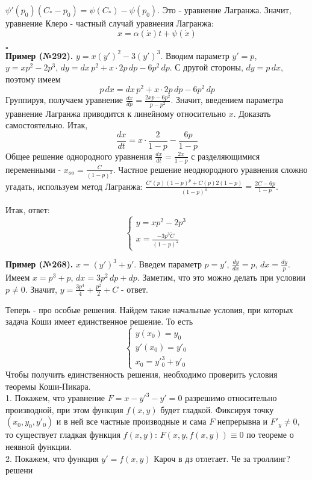 $\psi'(p_0)(C_*-p_0)=\psi(C_*)-\psi(p_0)$. 
Это - уравнение Лагранжа. Значит, уравнение Клеро - частный случай уравнения 
Лагранжа:
$$x=\alpha(\dot x)t+\psi(\dot x)$$


$\square$ \\

\textbf{Пример (№292).} $y=x(y')^2-3(y')^3$. Вводим параметр 
 $y'=p$, $y=xp^2-2p^3$,  $dy=dx\,p^2+x\cdot 2p\,dp-6p^2\,dp$. С другой 
 стороны, $dy=p\,dx$, поэтому имеем
$$p\,dx=dx\,p^2+x\cdot 2p\,dp-6p^2\,dp$$ 
Группируя,  получаем уравнение $\frac{dx}{dp}=\frac{2xp-6p^2}{p-p^2}$.
Значит, введением параметра уравнение Лагранжа приводится к линейному
относительно $x$. Доказать самостоятельно. Итак,
$$\frac{dx}{dt}=x\cdot \frac{2}{1-p}-\frac{6p}{1-p}$$ 
Общее решение однородного уравнения $\frac{dx}{dt}=\frac{2x}{1-p}$ 
с разделяющимися переменными - $x_{oo}=\frac{C}{(1-p)^2}$. 
Частное решение неоднородного уравнения сложно угадать, используем 
метод Лагранжа: $\frac{C'(p)(1-p)^p+C(p)2(1-p)}{(1-p)^4}=\frac{2C-6p}{1-p}$.

Итак, ответ:
$$\begin{cases}
    y=xp^2-2p^3\\x=\frac{-3p^3\tilde C}{(1-p)^2}
\end{cases}$$

\textbf{Пример (№268).}
$x=(y')^3+y'$. Введем параметр  $p=y'$,  $\frac{dy}{dx}=p$, $dx=\frac{dy}{p}$.
Имеем $x=p^3+p$,  $dx=3p^2\,dp+dp$. Заметим, что это можно делать при 
условии  $p\ne 0$. 
Значит,  $y=\frac{3p^4}{4}+\frac{p^2}{2}+C$ - ответ.

Теперь - про особые решения. Найдем такие начальные условия, при которых
задача Коши имеет единственное решение. То есть
$$\begin{cases}
    y(x_0)=y_0\\y'(x_0)=y'_0\\x_0=y'^3_0+y'_0
\end{cases}$$
Чтобы получить единственность решения, необходимо проверить условия
теоремы Коши-Пикара.\\
1. Покажем, что уравнение $F=x-y'^3-y'=0$ разрешимо относительно производной, 
при этом функция  $f(x,y)$ будет гладкой. Фиксируя точку
$(x_0,y_0,y'_0)$ и в ней все частные производные и сама $F$ непрерывна и
$F'_y\ne 0$, то
существует гладкая функция $f(x,y)$:  $F(x,y,f(x,y))\equiv 0$ по теореме о 
неявной функции. \\
2. Покажем, что функция  $y'=f(x,y)$
Кароч в дз отлетает. Че за троллинг?
решени


